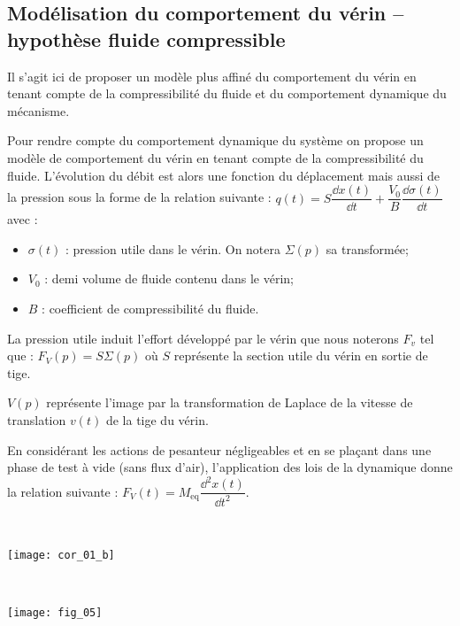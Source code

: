 \subsection*{Modélisation du comportement du vérin -- hypothèse fluide compressible}
\ifprof
\else

\begin{obj}
Il s'agit ici de proposer un modèle plus affiné du comportement du vérin en tenant compte de la compressibilité du fluide et du comportement dynamique du mécanisme.
\end{obj}		



Pour rendre compte du comportement dynamique du système on propose un modèle de comportement du vérin en tenant compte de la compressibilité du fluide. L'évolution du débit est alors une fonction du déplacement mais aussi de la pression sous la forme de la relation suivante : $q(t)=S\dfrac{\dd x(t)}{\dd t}+\dfrac{V_0}{B}\dfrac{\dd \sigma(t)}{\dd t}$ avec : 
\begin{itemize}
\item $\sigma(t)$ : pression utile dans le vérin. On notera $\Sigma(p)$ sa transformée;
\item $V_0$ : demi volume de fluide contenu dans le vérin;
\item $B$ : coefficient de compressibilité du fluide.
\end{itemize}  

La pression utile induit l'effort développé par le vérin que nous noterons $F_v$ tel que : $F_V(p)=S\Sigma(p)$ où $S$ représente la section utile du vérin en sortie de tige.

$V(p)$ représente l'image par la transformation de Laplace de la vitesse de translation $v(t)$ de la tige du vérin. 

En considérant les actions de pesanteur négligeables et en se plaçant dans une phase de test à vide (sans flux d'air), l'application des lois de la dynamique donne la relation suivante : $F_V(t)=M_{\text{eq}} \dfrac{\dd^2 x(t)}{\dd t^2}$.

\fi 

\ifprof
\begin{corrige} ~\\
\begin{center}
\texttt{[image: cor\_01\_b]}
\end{center}

\end{corrige}
\else
\
\begin{marginfigure}
\texttt{[image: fig\_05]}
\end{marginfigure}

